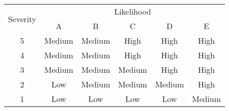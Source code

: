 \begin{table}[]
\begin{tabular}{cccccc}
\toprule
\multirow{2}{*}{Severity} & \multicolumn{5}{c}{Likelihood}                                                                                                                                    \\ \cmidrule{2-6} 
  & A                              & B                              & C                              & D                              & E                              \\ \midrule
5 & \cellcolor{yellow}Medium & \cellcolor{yellow}Medium & \cellcolor{red}High      & \cellcolor{red}High      & \cellcolor{red}High   \\ 
4 & \cellcolor{yellow}Medium & \cellcolor{yellow}Medium & \cellcolor{red}High      & \cellcolor{red}High      & \cellcolor{red}High   \\ 
3 & \cellcolor{yellow}Medium & \cellcolor{yellow}Medium & \cellcolor{yellow}Medium & \cellcolor{red}High      & \cellcolor{red}High   \\ 
2 & \cellcolor{green}Low     & \cellcolor{yellow}Medium & \cellcolor{yellow}Medium & \cellcolor{yellow}Medium & \cellcolor{red}High   \\ 
1 & \cellcolor{green}Low     & \cellcolor{green}Low     & \cellcolor{green}Low     & \cellcolor{green}Low     & \cellcolor{yellow}Medium \\ \bottomrule
\end{tabular}
\end{table}


